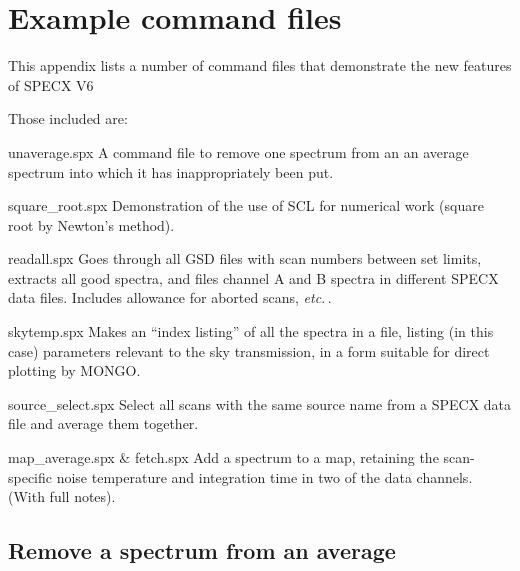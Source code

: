 \documentclass[11pt,twoside]{report}
\newcommand{\etc}{{\it etc.\,}}
\begin{document}
\newpage
\chapter{Example command files} 

This appendix lists a number of command files that demonstrate the new
features of SPECX V6

Those included are:
\begin{description}
\item{unaverage.spx} A command file to remove one spectrum from an an
       average spectrum into which it has inappropriately been put.
\item{square\_root.spx} Demonstration of the use of SCL for numerical
       work (square root by Newton's method).
\item{readall.spx} Goes through all GSD files with scan numbers between
       set limits, extracts all good spectra, and files channel A and B
       spectra in different SPECX data files. Includes allowance for
       aborted scans, \etc.
\item{skytemp.spx} Makes an ``index listing'' of all the spectra in a
       file, listing (in this case) parameters relevant to the sky 
       transmission, in a form suitable for direct plotting by MONGO.
\item{source\_select.spx} Select all scans with the same source name from a
       SPECX data file and average them together.
\item{map\_average.spx \& fetch.spx} Add a spectrum to a map, retaining the
       scan-specific noise temperature and integration time in two of the
       data channels. (With full notes).
\end{description}

\newpage
\section{Remove a spectrum from an average} 
\end{document}
